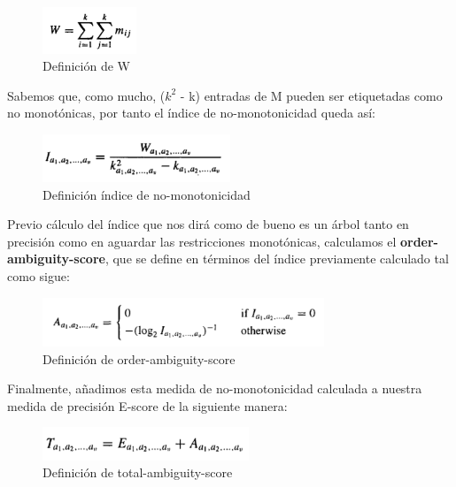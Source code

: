 \begin{figure}[H]
	\centering
	\includegraphics[width=0.25\textwidth]{imagenes/wsum} 
	\caption{Definición de W \cite{ref14}}
\end{figure}

Sabemos que, como mucho, ($k^2$ - k) entradas de M pueden ser etiquetadas como no monotónicas, por tanto el índice de no-monotonicidad queda así:

\begin{figure}[H]
	\centering
	\includegraphics[width=0.5\textwidth]{imagenes/inm} 
	\caption{Definición índice de no-monotonicidad \cite{ref14}}
\end{figure}

Previo cálculo del índice que nos dirá como de bueno es un árbol tanto en precisión como en aguardar las restricciones monotónicas, calculamos el \textbf{order-ambiguity-score}, que se define en términos del índice previamente calculado tal como sigue:

\begin{figure}[H]
	\centering
	\includegraphics[width=0.75\textwidth]{imagenes/oas} 
	\caption{Definición de order-ambiguity-score \cite{ref14}}
\end{figure}

Finalmente, añadimos esta medida de no-monotonicidad calculada a nuestra medida de precisión E-score de la siguiente manera:

\begin{figure}[H]
	\centering
	\includegraphics[width=0.55\textwidth]{imagenes/tas} 
	\caption{Definición de total-ambiguity-score \cite{ref14}}
\end{figure}

